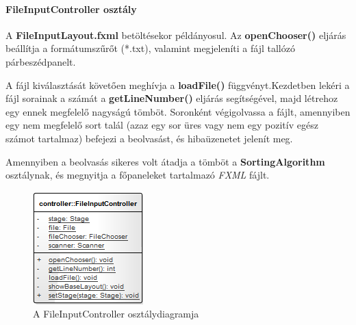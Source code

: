 \documentclass{elteikthesis}
\begin{document}
\paragraph{FileInputController osztály}
A \textbf{FileInputLayout.fxml} betöltésekor példányosul. Az \textbf{openChooser()} eljárás beállítja a formátumszűrőt (*.txt), valamint megjeleníti a fájl tallózó párbeszédpanelt.\par A fájl kiválasztását követően meghívja a \textbf{loadFile()} függvényt.Kezdetben lekéri a fájl sorainak a számát a \textbf{getLineNumber()} eljárás segítségével, majd létrehoz egy ennek megfelelő nagyságú tömböt. Soronként végigolvassa a fájlt, amennyiben egy nem megfelelő sort talál (azaz egy sor üres vagy nem egy pozitív egész számot tartalmaz) befejezi a beolvasást, és hibaüzenetet jelenít meg.\par Amennyiben a beolvasás sikeres volt átadja a tömböt a \textbf{SortingAlgorithm} osztálynak, és megnyitja a főpaneleket tartalmazó \emph{FXML} fájlt.
\begin{figure}[H]
	\centering
	\includegraphics{pics/class/FileInputController.png}
	\caption{A FileInputController osztálydiagramja}
\end{figure}
\end{document}

